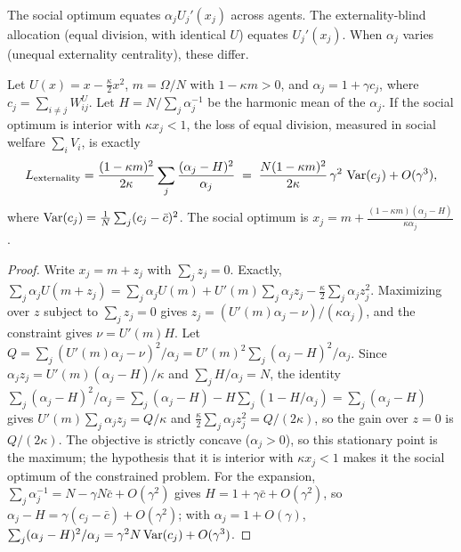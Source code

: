 \documentclass[../structural_economics_book.tex]{subfiles}
\begin{document}
The social optimum equates $\alpha_j U_j'(x_j)$ across agents. The externality-blind allocation (equal division, with identical $U$) equates $U_j'(x_j)$. When $\alpha_j$ varies (unequal externality centrality), these differ.

\begin{proposition}\label{ch02:prop:ext_loss}
Let $U(x) = x - \frac{\kappa}{2}x^2$, $m = \Omega/N$ with $1 - \kappa m > 0$, and $\alpha_j = 1 + \gamma c_j$, where $c_j = \sum_{i \neq j} W^U_{ij}$. Let $H = N/\sum_j \alpha_j^{-1}$ be the harmonic mean of the $\alpha_j$. If the social optimum is interior with $\kappa x_j < 1$, the loss of equal division, measured in social welfare $\sum_i V_i$, is exactly
\begin{equation}\label{ch02:eq:ext_loss}
L_{\text{externality}} = \frac{(1 - \kappa m)^2}{2\kappa}\sum_j \frac{(\alpha_j - H)^2}{\alpha_j} \;=\; \frac{N(1-\kappa m)^2}{2\kappa}\,\gamma^2\,\operatorname{Var}(c_j) + O(\gamma^3),
\end{equation}
where $\operatorname{Var}(c_j) = \frac{1}{N}\sum_j(c_j - \bar{c})^2$. The social optimum is $x_j = m + \frac{(1-\kappa m)(\alpha_j - H)}{\kappa\alpha_j}$.
\end{proposition}

\begin{proof}
Write $x_j = m + z_j$ with $\sum_j z_j = 0$. Exactly, $\sum_j \alpha_j U(m + z_j) = \sum_j \alpha_j U(m) + U'(m)\sum_j \alpha_j z_j - \frac{\kappa}{2}\sum_j \alpha_j z_j^2$. Maximizing over $z$ subject to $\sum_j z_j = 0$ gives $z_j = (U'(m)\alpha_j - \nu)/(\kappa\alpha_j)$, and the constraint gives $\nu = U'(m)H$. Let $Q = \sum_j (U'(m)\alpha_j - \nu)^2/\alpha_j = U'(m)^2\sum_j(\alpha_j - H)^2/\alpha_j$. Since $\alpha_j z_j = U'(m)(\alpha_j - H)/\kappa$ and $\sum_j H/\alpha_j = N$, the identity $\sum_j(\alpha_j - H)^2/\alpha_j = \sum_j(\alpha_j - H) - H\sum_j(1 - H/\alpha_j) = \sum_j(\alpha_j - H)$ gives $U'(m)\sum_j\alpha_j z_j = Q/\kappa$ and $\frac{\kappa}{2}\sum_j\alpha_j z_j^2 = Q/(2\kappa)$, so the gain over $z = 0$ is $Q/(2\kappa)$. The objective is strictly concave ($\alpha_j > 0$), so this stationary point is the maximum; the hypothesis that it is interior with $\kappa x_j < 1$ makes it the social optimum of the constrained problem. For the expansion, $\sum_j \alpha_j^{-1} = N - \gamma N\bar c + O(\gamma^2)$ gives $H = 1 + \gamma\bar c + O(\gamma^2)$, so $\alpha_j - H = \gamma(c_j - \bar c) + O(\gamma^2)$; with $\alpha_j = 1 + O(\gamma)$, $\sum_j(\alpha_j - H)^2/\alpha_j = \gamma^2 N\operatorname{Var}(c_j) + O(\gamma^3)$.
\end{proof}
\end{document}
